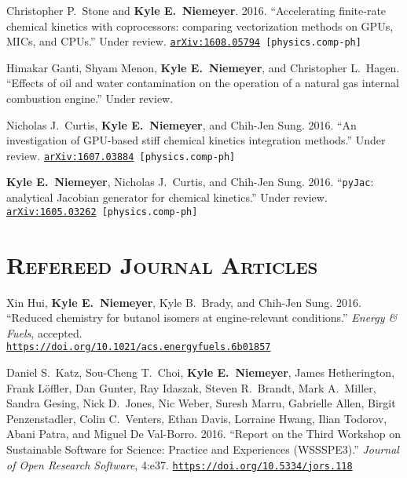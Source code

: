 \documentclass[margin,line,11pt]{res}
\makeatletter
\newlength{\bibhang}
\newlength{\bibsep}
 {\@listi \global\bibsep\itemsep \global\advance\bibsep by\parsep}
\newenvironment{bibenum*}
  {\renewcommand\labelenumi{\theenumi.}%
   \etaremune[
     topsep=0pt,
     itemsep=\bibsep,
     parsep=0pt,partopsep=0pt,
     itemindent=-\bibhang,
     leftmargin={\bibhang+\widthof{[999]}}]}
  {\endetaremune}
\newcommand*{\doi}[1]{\href{https://doi.org/#1}{\nolinkurl{https://doi.org/#1}}}
\makeatother
\begin{document}
\begin{resume}
\begin{bibenum*}

\item Christopher P.~Stone and \textbf{Kyle E.~Niemeyer}.
2016.
``Accelerating finite-rate chemical kinetics with coprocessors: comparing vectorization methods on GPUs, MICs, and CPUs.''
Under review. {\tt \href{http://arxiv.org/abs/1608.05794}{arXiv:1608.05794} [physics.comp-ph]}

\item Himakar Ganti, Shyam Menon, \textbf{Kyle E.~Niemeyer}, and Christopher L.~Hagen.
``Effects of oil and water contamination on the operation of a natural gas internal combustion engine.''
Under review.

\item Nicholas J.~Curtis, \textbf{Kyle E.~Niemeyer}, and Chih-Jen Sung.
2016.
``An investigation of GPU-based stiff chemical kinetics integration methods.''
Under review. {\tt \href{http://arxiv.org/abs/1607.03884}{arXiv:1607.03884} [physics.comp-ph]}


\item \textbf{Kyle E.~Niemeyer}, Nicholas J.~Curtis, and Chih-Jen Sung.
2016.
``\texttt{pyJac}: analytical Jacobian generator for chemical kinetics.''
Under review. {\tt \href{http://arxiv.org/abs/1605.03262}{arXiv:1605.03262} [physics.comp-ph]}

\end{bibenum*}

\section{\textsc{Refereed Journal Articles}}

\begin{bibenum*}

\item Xin Hui, \textbf{Kyle E.~Niemeyer}, Kyle B.~Brady, and Chih-Jen Sung.
2016.
``Reduced chemistry for butanol isomers at engine-relevant conditions.''
\textit{Energy \& Fuels}, accepted. \\
\doi{10.1021/acs.energyfuels.6b01857}

\item Daniel S.~Katz, Sou-Cheng T.\ Choi, \textbf{Kyle E.\ Niemeyer}, James Hetherington, Frank L\"{o}ffler, Dan Gunter, Ray Idaszak, Steven R.\ Brandt, Mark A.\ Miller, Sandra Gesing, Nick D.\ Jones, Nic Weber, Suresh Marru, Gabrielle Allen, Birgit Penzenstadler, Colin C.\ Venters, Ethan Davis, Lorraine Hwang, Ilian Todorov, Abani Patra, and Miguel De Val-Borro.
2016.
``Report on the Third Workshop on Sustainable Software for Science: Practice and Experiences (WSSSPE3).''
\emph{Journal of Open Research Software}, 4:e37.
\doi{10.5334/jors.118}


\end{bibenum*}
\end{resume}
\end{document}
